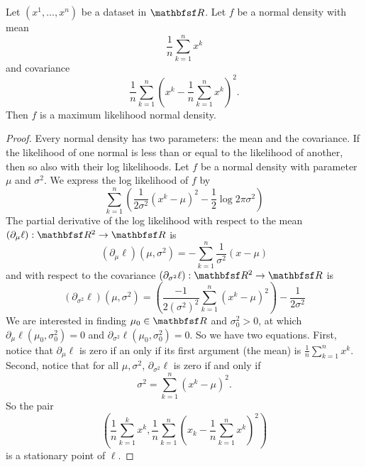 \begin{proposition}
Let $(x^1, \dots , x^n)$ be a dataset in $\R $.
Let $f$ be a normal density with mean
  \[
\frac{1}{n} \sum_{k = 1}^{n} x^k
  \]
and covariance
  \[
\frac{1}{n} \sum_{k = 1}^{n} \left(x^k - \frac{1}{n} \sum_{k = 1}^{n} x^k\right)^2.
  \]
Then $f$ is a maximum likelihood normal density.\end{proposition}
\begin{proof}Every normal density has two parameters: the mean and the covariance.
If the likelihood of one normal is less than or equal to the likelihood of another, then so also with their log likelihoods.
Let $f$ be a normal density with parameter $\mu $ and $\sigma ^2$.
We express the log likelihood of $f$ by
  \[
\sum_{k = 1}^{n} \left( \frac{1}{2\sigma ^2}(x^k - \mu )^2 - \frac{1}{2}\log2\pi \sigma ^2\right)
  \]
The partial derivative of the log likelihood with respect to the mean $(\partial_{\mu } \ell ): \R ^2 \to \R $ is
  \[
(\partial_\mu  \ell )(\mu , \sigma ^2) = - \sum_{k = 1}^{n} \frac{1}{\sigma ^2}(x - \mu )
  \]
and with respect to the covariance $(\partial_{\sigma ^2} \ell ): \R ^2 \to \R $ is
  \[
(\partial_{\sigma ^2} \ell )(\mu , \sigma ^2) =
\left(\frac{-1}{2(\sigma ^2)^{2}}\sum_{k = 1}^{n}(x^k - \mu )^2\right)- \frac{1}{2\sigma ^2}
  \]
We are interested in finding $\mu _0 \in \R $ and $\sigma ^2_0 > 0$, at which $\partial_\mu  \ell (\mu _0, \sigma ^2_0) = 0$ and $\partial_{\sigma ^2} \ell (\mu _0, \sigma ^2_0) = 0$.
So we have two equations.
First, notice that $\partial_\mu  \ell $ is zero if an only if its first argument (the mean) is $\frac{1}{n} \sum_{k = 1}^{n} x^k$.
Second, notice that for all $\mu , \sigma ^2$, $\partial_{\sigma ^2}\ell $ is zero if and only if
  \[
\sigma ^2 = \sum_{k = 1}^{n} (x^k - \mu )^2.
  \]
So the pair
  \[
\left(\frac{1}{n}\sum_{k = 1}^{k} x^k, \frac{1}{n} \sum_{k = 1}^{n} (x_k - \frac{1}{n} \sum_{k = 1}^{n} x^k)^2\right)
  \]
is a stationary point of $\ell $.\end{proof}
